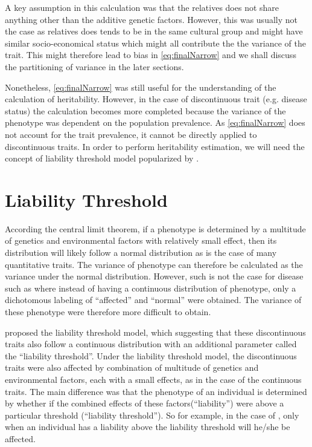 \documentclass[12pt]{book}
\newcommand*{\glng}{\glsentrylong}
\begin{document}
	A key assumption in this calculation was that the relatives does not share anything other than the additive genetic factors.
	However, this was usually not the case as relatives does tends to be in the same cultural group and might have similar socio-economical status which might all contribute the the variance of the trait.
	This might therefore lead to bias in \cref{eq:finalNarrow} and we shall discuss the partitioning of variance in the later sections.
	
	Nonetheless, \cref{eq:finalNarrow} was still useful for the understanding of the calculation of heritability.
	However, in the case of discontinuous trait (e.g. disease status) the calculation becomes more completed because the variance of the phenotype was dependent on the population prevalence.
	As \cref{eq:finalNarrow} does not account for the trait prevalence, it cannot be directly applied to discontinuous traits.
	In order to perform heritability estimation, we will need the concept of liability threshold model popularized by \cite{Falconer1965}.
	
	\section{Liability Threshold}
	\label{sec:liability}
	According the central limit theorem, if a phenotype is determined by a multitude of genetics and environmental factors with relatively small effect, then its distribution will likely follow a normal distribution as is the case of many quantitative traits\citep{Visscher2008}. %
	The variance of phenotype can therefore be calculated as the variance under the normal distribution.
	However, such is not the case for disease such as \glng{scz} where instead of having a continuous distribution of phenotype, only a dichotomous labeling of ``affected'' and ``normal'' were obtained.
	The variance of these phenotype were therefore more difficult to obtain.
	
	\citet{Falconer1965} proposed the liability threshold model, which suggesting that these discontinuous traits also follow a continuous distribution with an additional parameter called the ``liability threshold''.
	Under the liability threshold model, the discontinuous traits were also affected by combination of multitude of genetics and environmental factors, each with a small effects, as in the case of the continuous traits.
	The main difference was that the phenotype of an individual is determined by whether if the combined effects of these factors(``liability'') were above a particular threshold (``liability threshold'').
	So for example, in the case of \glng{scz}, only when an individual has a liability above the liability threshold will he/she be affected.
	
\end{document}
